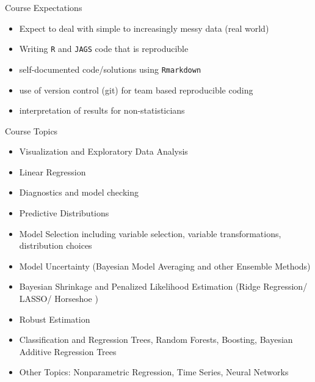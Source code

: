 \documentclass[ignorenonframetext,]{beamer}
\providecommand{\tightlist}{%
  \setlength{\itemsep}{0pt}\setlength{\parskip}{0pt}}
\begin{document}
\begin{frame}[fragile]{Course Expectations}
\protect\hypertarget{course-expectations}{}

\begin{itemize}[<+->]
\tightlist
\item
  Expect to deal with simple to increasingly messy data (real world)
\item
  Writing \texttt{R} and \texttt{JAGS} code that is reproducible
\item
  self-documented code/solutions using \texttt{Rmarkdown}
\item
  use of version control (git) for team based reproducible coding
\item
  interpretation of results for non-statisticians
\end{itemize}

\end{frame}

\begin{frame}{Course Topics}
\protect\hypertarget{course-topics}{}

\begin{itemize}[<+->]
\tightlist
\item
  Visualization and Exploratory Data Analysis
\item
  Linear Regression
\item
  Diagnostics and model checking
\item
  Predictive Distributions
\item
  Model Selection including variable selection, variable
  transformations, distribution choices
\item
  Model Uncertainty (Bayesian Model Averaging and other Ensemble
  Methods)
\item
  Bayesian Shrinkage and Penalized Likelihood Estimation (Ridge
  Regression/ LASSO/ Horseshoe )
\item
  Robust Estimation
\item
  Classification and Regression Trees, Random Forests, Boosting,
  Bayesian Additive Regression Trees
\item
  Other Topics: Nonparametric Regression, Time Series, Neural Networks
\end{itemize}

\end{frame}
\end{document}
